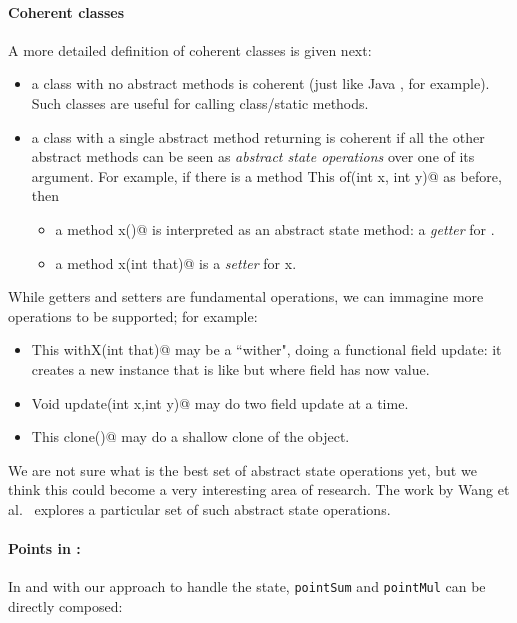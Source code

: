 \paragraph*{Coherent classes} A more detailed definition of coherent
classes is given next:
\begin{itemize}
\item a class with no abstract methods is coherent (just like Java
  \Q@Math@, for example). Such classes are useful for calling class/static methods.
\item a class with a single abstract \Q@class@ method returning \Q@This@
is coherent if all the other abstract methods can be seen as \emph{abstract state
operations} over one of its argument.
For example,
if there is a \Q@class method This of(int x, int y)@ as before,
then
\begin{itemize}
\item a method \Q@int x()@ is interpreted as an abstract state method: a \emph{getter} for \Q@x@.
\item a method \Q@Void x(int that)@ is a \emph{setter} for x.
\end{itemize}
\end{itemize}

While getters and setters are fundamental operations, we can immagine
more operations to be supported; for example:
\begin{itemize}
\item \Q@method This withX(int that)@
may be a ``wither", doing a functional field update: it creates a new instance that is like \Q@this@ but where field \Q@x@ has now \Q@that@ value.
\item \Q@method Void update(int x,int y)@
may do two field update at a time.
\item\Q@method This clone()@ may do a shallow clone of the object.
\end{itemize}

We are not sure what is the best set of abstract state operations yet,
but we think this could become a very interesting area of research.
The work by Wang et al.~\cite{wang2016classless} explores a particular
set of such abstract state operations.

\paragraph{Points in \name:}
In \name and with our approach to handle the state, 
\lstinline{pointSum} and \lstinline{pointMul} can be directly composed:

